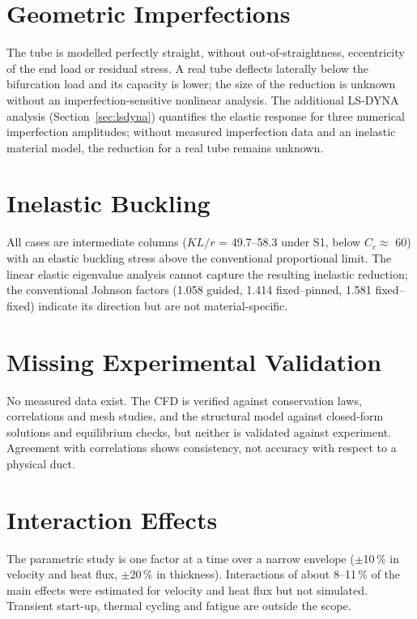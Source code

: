 \section{Geometric Imperfections}
The tube is modelled perfectly straight, without out-of-straightness, eccentricity of the end load or residual stress. A real tube deflects
laterally below the bifurcation load and its capacity is lower; the size of the reduction is unknown without an imperfection-sensitive
nonlinear analysis. The additional LS-DYNA analysis (Section~\ref{sec:lsdyna}) quantifies the elastic response for three numerical imperfection
amplitudes; without measured imperfection data and an inelastic material model, the reduction for a real tube remains unknown.

\section{Inelastic Buckling}
All cases are intermediate columns ($KL/r$ = 49.7--58.3 under S1, below $C_c \approx$ 60) with an elastic buckling stress above the conventional
proportional limit. The linear elastic eigenvalue analysis cannot capture the resulting inelastic reduction; the conventional Johnson factors
(1.058 guided, 1.414 fixed--pinned, 1.581 fixed--fixed) indicate its direction but are not material-specific.

\section{Missing Experimental Validation}
No measured data exist. The CFD is verified against conservation laws, correlations and mesh studies, and the structural model against
closed-form solutions and equilibrium checks, but neither is validated against experiment. Agreement with correlations shows consistency,
not accuracy with respect to a physical duct.

\section{Interaction Effects}
The parametric study is one factor at a time over a narrow envelope ($\pm$10\,\% in velocity and heat flux, $\pm$20\,\% in thickness). Interactions
of about 8--11\,\% of the main effects were estimated for velocity and heat flux but not simulated. Transient start-up, thermal cycling and
fatigue are outside the scope.
